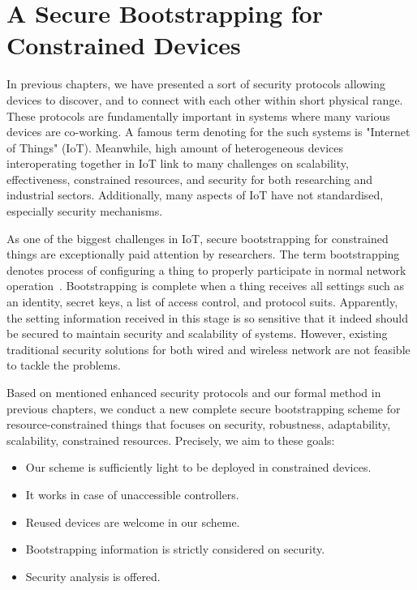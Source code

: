 \chapter{A Secure Bootstrapping for Constrained Devices} %

\label{Chapter5} %



In previous chapters, we have presented a sort of security protocols allowing devices to discover, and to connect with each other within short physical range. These protocols are fundamentally important in systems where many various devices are co-working. A famous term denoting for the such systems is "Internet of Things" (IoT). Meanwhile, high amount of heterogeneous devices interoperating together in IoT link to many challenges on scalability, effectiveness, constrained resources, and security for both researching and industrial sectors. Additionally, many aspects of IoT have not standardised, especially security mechanisms. 

As one of the biggest challenges in IoT, secure bootstrapping for constrained things are exceptionally paid attention by researchers. The term bootstrapping denotes process of configuring a thing to properly participate in normal network operation~\cite{secureboot}. Bootstrapping is complete when a thing receives all settings such as an identity, secret keys, a list of access control, and protocol suits. Apparently, the setting information received in this stage is so sensitive that it indeed should be secured to maintain security and scalability of systems. However, existing traditional security solutions for both wired and wireless network are not feasible to tackle the problems. 

Based on mentioned enhanced security protocols and our formal method in previous chapters, we conduct a new complete secure bootstrapping scheme for resource-constrained things that focuses on security, robustness, adaptability, scalability, constrained resources. Precisely, we aim to these goals:
\begin{itemize}
\item Our scheme is sufficiently light to be deployed in constrained devices.
\item It works in case of unaccessible controllers.
\item Reused devices are welcome in our scheme.
\item Bootstrapping information is strictly considered on security.
\item Security analysis is offered. 
\end{itemize}

